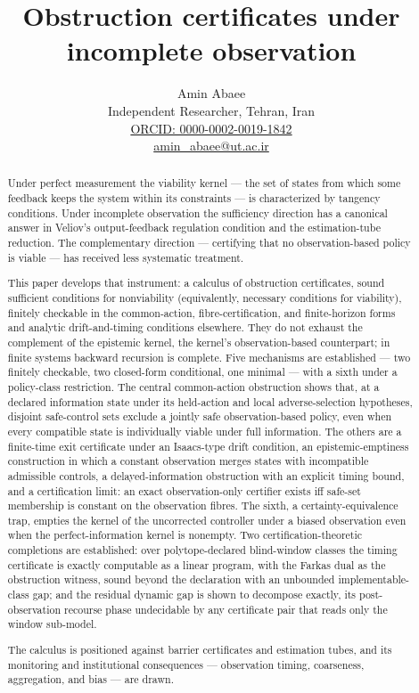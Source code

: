 \documentclass[10pt,twocolumn]{article}
\title{Obstruction certificates under incomplete observation}
\author{Amin Abaee\\[0.35em]
{\small Independent Researcher, Tehran, Iran}\\[0.55em]
{\small\href{https://orcid.org/0000-0002-0019-1842}{ORCID: 0000-0002-0019-1842}}\\[0.3em]
{\small\href{mailto:amin\_abaee@ut.ac.ir}{amin\_abaee@ut.ac.ir}}}
\theoremstyle{definition}
\begin{document}
\maketitle

\begin{abstract}

Under perfect measurement the viability kernel --- the set of states
from which some feedback keeps the system within its constraints --- is
characterized by tangency conditions. Under incomplete observation the
sufficiency direction has a canonical answer in Veliov's
output-feedback regulation condition and the estimation-tube reduction.
The complementary direction --- certifying that no observation-based
policy is viable --- has received less systematic treatment.

This paper develops that instrument: a calculus of obstruction
certificates, sound sufficient conditions for nonviability (equivalently, necessary conditions for viability), finitely
checkable in the common-action, fibre-certification, and finite-horizon forms and analytic drift-and-timing conditions elsewhere. They do not exhaust the complement of the epistemic kernel, the kernel's observation-based counterpart; in finite systems backward recursion is complete. Five mechanisms are established --- two finitely checkable, two
closed-form conditional, one minimal --- with a sixth under a
policy-class restriction. The central common-action obstruction shows that, at a declared
information state under its held-action and local adverse-selection
hypotheses, disjoint safe-control sets exclude a jointly safe
observation-based policy, even when every compatible state is
individually viable under full information. The others are a finite-time
exit certificate under an Isaacs-type drift condition, an
epistemic-emptiness construction in which a constant observation merges
states with incompatible admissible controls, a delayed-information
obstruction with an explicit timing bound, and a certification limit:
an exact observation-only certifier exists iff safe-set
membership is constant on the observation fibres. The sixth, a
certainty-equivalence trap, empties the kernel of the uncorrected controller under a biased
observation even when the perfect-information kernel is nonempty.
Two certification-theoretic completions are established: over polytope-declared
blind-window classes the timing certificate is exactly computable as a linear
program, with the Farkas dual as the obstruction witness, sound beyond the
declaration with an unbounded implementable-class gap; and the residual dynamic
gap is shown to decompose exactly, its post-observation recourse phase
undecidable by any certificate pair that reads only the window sub-model.

The calculus is positioned against barrier certificates and estimation
tubes, and its monitoring and institutional consequences ---
observation timing, coarseness, aggregation, and bias --- are drawn.

\end{abstract}
\end{document}
